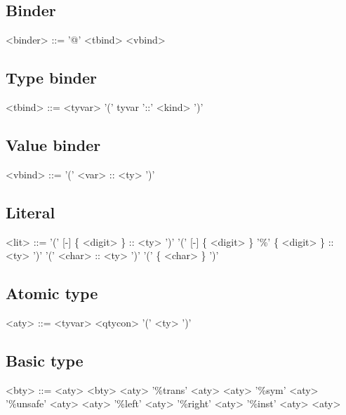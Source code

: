 \subsection*{Binder}

\begin{grammar}
<binder> ::= '@' <tbind>
        \alt <vbind>
\end{grammar}

\subsection*{Type binder}

\begin{grammar}
<tbind> ::= <tyvar>
       \alt '(' tyvar '::' <kind> ')'
\end{grammar}

\subsection*{Value binder}

\begin{grammar}
<vbind> ::= '(' <var> :: <ty> ')'
\end{grammar}

\subsection*{Literal}

\begin{grammar}
<lit> ::= '(' [-] \{ <digit> \} :: <ty> ')'
     \alt '(' [-] \{ <digit> \} '\%' \{ <digit> \} :: <ty> ')'
     \alt '(' <char> :: <ty> ')'
     \alt '(' \{ <char> \} ')'
\end{grammar}

\subsection*{Atomic type}

\begin{grammar}
<aty> ::= <tyvar>
     \alt <qtycon>
     \alt '(' <ty> ')'
\end{grammar}

\subsection*{Basic type}

\begin{grammar}
<bty> ::= <aty>
     \alt <bty> <aty>
     \alt '\%trans' <aty> <aty>
     \alt '\%sym' <aty>
     \alt '\%unsafe' <aty> <aty>
     \alt '\%left' <aty>
     \alt '\%right' <aty>
     \alt '\%inst' <aty> <aty>
\end{grammar}

